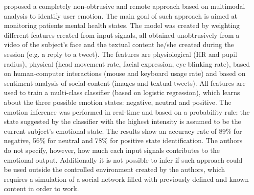 \textcite{mental} proposed a completely non-obtrusive and remote approach based on multimodal analysis to identify user emotion. The main goal of such approach is aimed at monitoring patients mental health states. The model was created by weighting different features created from input signals, all obtained unobtrusively from a video of the subject's face and the textual content he/she created during the session (e.g. a reply to a tweet). The features are physiological (HR and pupil radius), physical (head movement rate, facial expression, eye blinking rate), based on human-computer interactions (mouse and keyboard usage rate) and based on sentiment analysis of social content (images and textual tweets). All features are used to train a multi-class classifier (based on logistic regression), which learns about the three possible emotion states: negative, neutral and positive. The emotion inference was performed in real-time and based on a probability rule: the state suggested by the classifier with the highest intensity is assumed to be the current subject's emotional state. The results show an accuracy rate of 89\% for negative, 56\% for neutral and 78\% for positive state identification. The authors do not specify, however, how much each input signals contributes to the emotional output. Additionally it is not possible to infer if such approach could be used outside the controlled environment created by the authors, which requires a simulation of a social network filled with previously defined and known content in order to work.

